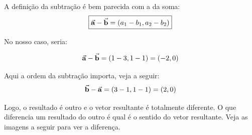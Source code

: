 \documentclass[12pt]{extarticle}
\newcommand{\<}{\langle}
\renewcommand{\>}{\rangle}
\theoremstyle{definition}
\begin{document}
A definição da subtração é bem parecida com a da soma: 
\begin{equation}
    \boxed{\va{a} - \va{b} = (a_1-b_1, a_2-b_2)}
\end{equation}


No nosso caso, seria:

\begin{equation}
    \va{a} - \va{b} = (1-3,1-1) = (-2,0)
\end{equation}

Aqui a ordem da subtração importa, veja a seguir:
\begin{equation}
    \va{b} - \va{a} = (3-1, 1-1) = (2,0)
\end{equation}

Logo, o resultado é outro e o vetor resultante é totalmente diferente. O que diferencia um resultado do outro é qual é o sentido do vetor resultante. Veja as imagens a seguir para ver a diferença.
\end{document}
